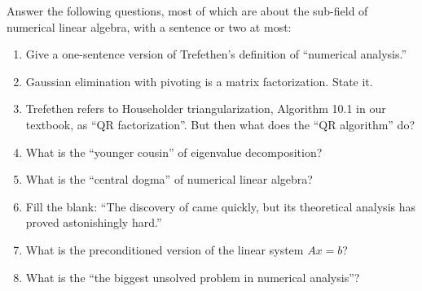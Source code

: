 \documentclass[12pt,dvipsnames]{amsart}
\begin{document}
\medskip
\noindent Answer the following questions, most of which are about the sub-field of numerical linear algebra, with a sentence or two at most:
\renewcommand{\labelenumi}{\emph{(\arabic{enumi})}}
\begin{enumerate}
\item Give a one-sentence version of Trefethen's definition of ``numerical analysis.''
\item Gaussian elimination with pivoting is a matrix factorization.  State it.
\item Trefethen refers to Householder triangularization, Algorithm 10.1 in our textbook, as ``QR factorization''.  But then what does the ``QR algorithm'' do?
\item What is the ``younger cousin'' of eigenvalue decomposition?
\item What is the ``central dogma'' of numerical linear algebra?
\item Fill the blank: ``The discovery of \underline{\phantom{LJpivotingAJ}} came quickly, but its theoretical analysis has proved astonishingly hard.'' %
\item What is the preconditioned version of the linear system $Ax=b$?
\item What is the ``the biggest unsolved problem in numerical analysis''?
\end{enumerate}
\end{document}
